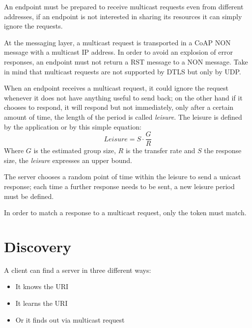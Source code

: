 	An endpoint must be prepared to receive multicast requests even from different addresses, if an endpoint is not interested in sharing its resources it can simply ignore the requests.\newline
	
	At the messaging layer, a multicast request is transported in a CoAP NON message with a multicast IP address.\newline
	In order to avoid an explosion of error responses, an endpoint must not return a RST message to a NON message.\newline
	Take in mind that multicast requests are not supported by DTLS but only by UDP.\newline
	
	When an endpoint receives a multicast request, it could ignore the request whenever it does not have anything useful to send back; on the other hand if it chooses to respond, it will respond but not immediately, only after a certain amount of time, the length of the period is called \emph{leisure}.\newline
	The leisure is defined by the application or by this simple equation:
	\begin{equation}Leisure=S\cdot\frac{G}{R}\end{equation}
	Where $G$ is the estimated group size, $R$ is the transfer rate and $S$ the response size, the \emph{leisure} expresses an upper bound.\newline
	
	The server chooses a random point of time within the leisure to send a unicast response; 
	each time a further response needs to be sent, a new leisure period must be defined.\newline
	
	In order to match a response to a multicast request, only the token must match.\newline
	
	\section{Discovery}\label{sc:discovery}
	A client can find a server in three different ways:
	\begin{itemize}
		\item It knows the URI
		\item It learns the URI
		\item Or it finds out via multicast request
	\end{itemize}

